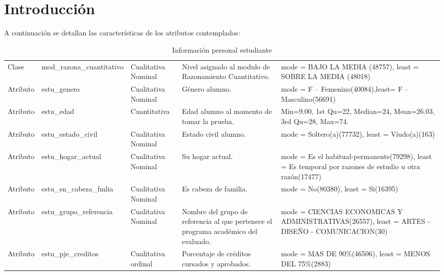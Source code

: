 \section{Introducción}
A continuación se detallan las características de los atributos contemplados:
\begin{table}[H]
\caption{Información personal estudiante}
\begin{flushleft}
\begin{tabular}{|>{\centering\arraybackslash}m{2cm}|>{\arraybackslash}m{4cm}|>{\arraybackslash}m{2cm}|>{\arraybackslash}m{3cm}|>{\arraybackslash}m{4cm}| }
\hline
  \rowcolor{blue!55} 
   \multicolumn{1}{|c|}{Atributo/Clase} & \multicolumn{1}{c|}{Nombre} & \multicolumn{1}{c|}{Tipo} & 
   \multicolumn{1}{c|}{Descripción} & \multicolumn{1}{c|}{Estadística} \\ \hline
    Clase & mod\_razona\_cuantitativo & Cualitativa Nominal & Nivel asignado al modulo de Razonamiento Cuantitativo. & mode = BAJO LA MEDIA (48757),
    least = SOBRE LA MEDIA  (48018) \\ \hline
    Atributo & estu\_genero & Cualitativa Nominal & Género alumno. & mode = F – Femenino(40084),least= F – Masculino(56691) \\ \hline
    Atributo & estu\_edad & Cuantitativa & Edad alumno al momento de tomar la prueba. & Min=9.00, 1st Qu=22, Median=24,    Mean=26.03, 3rd Qu=28, Max=74. \\ \hline
    Atributo & estu\_estado\_civil & Cualitativa Nominal & Estado civil alumno. & mode = Soltero(a)(77732), least = Viudo(a)(163) \\ \hline
    Atributo & estu\_hogar\_actual & Cualitativa Nominal & Su hogar actual. & mode = Es el habitual-permanente(79298),
    least = Es temporal por razones de estudio u otra razón(17477) \\ \hline
    Atributo & estu\_sn\_cabeza\_fmlia & Cualitativa Nominal & Es cabeza de familia. & mode = No(80380), least = Si(16395) \\ \hline
    Atributo & estu\_grupo\_referencia & Cualitativa Nominal & Nombre del grupo de referencia al que pertenece el programa
    académico del evaluado. & mode = CIENCIAS ECONOMICAS Y ADMINISTRATIVAS(26557),
    least = ARTES - DISEÑO - COMUNICACION(30) \\ \hline
    Atributo & estu\_pje\_creditos & Cualitativa ordinal & Porcentaje de créditos cursados y aprobados. & mode = MAS DE 90\%(46506), least = MENOS DEL 75\%(2883)  \\ \hline

\end{tabular}
\end{flushleft}
\end{table}

